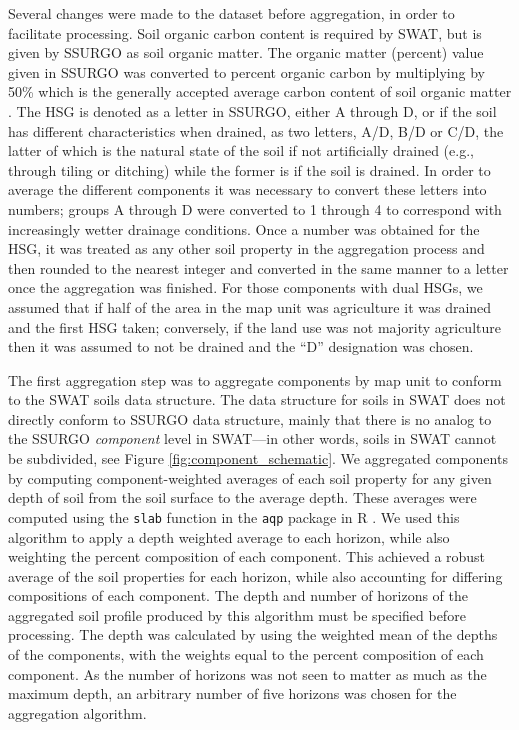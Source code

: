 Several changes were made to the dataset before aggregation, in order to
facilitate processing. Soil organic carbon content is required by SWAT, but is
given by SSURGO as soil organic matter. The organic matter (percent) value given in SSURGO
was converted to percent organic carbon by multiplying by 50\% which is the generally accepted average carbon content of soil organic matter \citep{brady_elements_2004}. The HSG is
denoted as a letter in SSURGO, either A through D, or if the soil has different
characteristics when drained, as two letters, A/D, B/D or C/D, the latter of
which is the natural state of the soil if not artificially drained (e.g.,
through tiling or ditching) while the former is if the soil is drained. In order
to average the different components it was necessary to convert these letters
into numbers; groups A through D were converted to 1 through 4 to correspond
with increasingly wetter drainage conditions. Once a number was obtained for the
HSG, it was treated as any other soil property in the aggregation process and
then rounded to the nearest integer and converted in the same manner to a letter
once the aggregation was finished. For those components with dual HSGs, we
assumed that if half of the area in the map unit was agriculture it was drained
and the first HSG taken; conversely, if the land use was not majority agriculture
then it was assumed to not be drained and the ``D'' designation was chosen.

The first aggregation step was to aggregate components by map unit to conform to
the SWAT soils data structure. The data structure for soils in SWAT does not
directly conform to SSURGO data structure, mainly that there is no analog to the
SSURGO \textit{component} level in SWAT---in other words, soils in SWAT cannot
be subdivided, see Figure \ref{fig:component_schematic}. We aggregated components by computing
component-weighted averages of each soil property for any given depth of soil from the soil surface to the average depth\cite{gatzke_aggregation_2011, beaudette_algorithms_2013}.
These averages were computed using the \texttt{slab} function in the \texttt{aqp} package in R \cite{beaudette_algorithms_2013}. We
used this algorithm to apply a depth weighted average to each horizon, while
also weighting the percent composition of each component. This achieved a robust
average of the soil properties for each horizon, while also accounting for
differing compositions of each component. The depth and number of horizons of
the aggregated soil profile produced by this algorithm must be specified before
processing. The depth was calculated by using the weighted mean of the depths of
the components, with the weights equal to the percent composition of each
component. As the number of horizons was not seen to matter as much as the
maximum depth, an arbitrary number of five horizons was chosen for the
aggregation algorithm.

